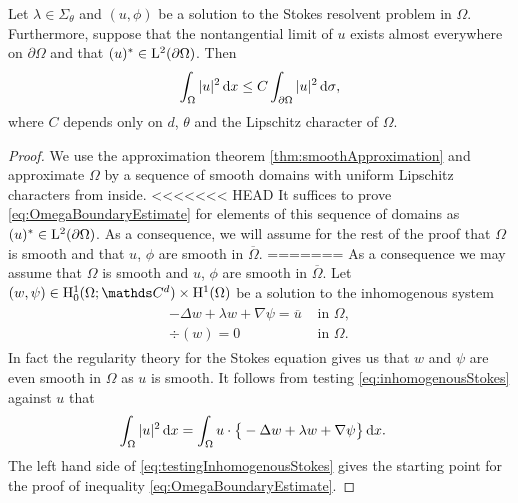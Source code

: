 \begin{lem}
  \label{lem:l2unique}
  Let $\lambda \in \Sigma_\theta$ and $(u,\phi)$ be a solution to the Stokes resolvent problem in $\Omega$.
  Furthermore, suppose that the nontangential limit of $u$ exists almost everywhere on $\partial\Omega$ and that $(u)^* \in \mathrm{L}^2(\partial\Omega)$.
  Then 
  \begin{align}
    \label{eq:OmegaBoundaryEstimate}
    \int_\Omega |u|^2 \, {\operatorname{d}\!{x}} \leq C \int_{\partial\Omega} |u|^2 \, {\operatorname{d}\!{\sigma}},
  \end{align}
  where $C$ depends only on $d$, $\theta$ and the Lipschitz character of $\Omega$.
\end{lem}

\begin{proof}
  We use the approximation theorem \ref{thm:smoothApproximation} and approximate $\Omega$ by a sequence of smooth domains with uniform Lipschitz characters from inside.
<<<<<<< HEAD
  It suffices to prove \eqref{eq:OmegaBoundaryEstimate} for elements of this sequence of domains as $(u)^* \in \mathrm{L}^2(\partial\Omega)$.
  As a consequence, we will assume for the rest of the proof that $\Omega$ is smooth and that $u$, $\phi$ are smooth in $\overline\Omega$.
=======
  As a consequence we may assume that $\Omega$ is smooth and $u$, $\phi$ are smooth in $\overline\Omega$.
  Let $(w,\psi) \in \HH_0^1(\Omega; \C^d) \times \HH^1(\Omega)$ be a solution to the inhomogenous system
  \begin{align}
    \label{eq:inhomogenousStokes}
    \begin{alignedat}{1}
      - \Delta w + \lambda w + \nabla \psi = \overline u &\text{ in } \Omega, \\
      \div(w) = 0 &\text{ in } \Omega.
    \end{alignedat}
  \end{align}
  In fact the regularity theory for the Stokes equation gives us that $w$ and $\psi$ are even smooth in $\Omega$ as $u$ is smooth.
  It follows from testing \eqref{eq:inhomogenousStokes} against $u$ that
  \begin{align}
    \label{eq:testingInhomogenousStokes}
    \int_\Omega |u|^2 \, {\operatorname{d}\!{x}}
    &= \int_\Omega u \cdot \big\{ - \Delta w + \lambda w + \nabla \psi \big\} \, {\operatorname{d}\!{x}}.
  \end{align}
  The left hand side of \eqref{eq:testingInhomogenousStokes} gives the starting point for the proof of inequality \eqref{eq:OmegaBoundaryEstimate}.
  

\end{proof}
